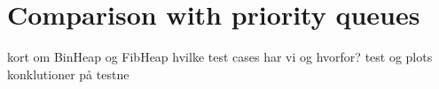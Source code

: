 \section*{Comparison with priority queues}
kort om BinHeap og FibHeap
hvilke test cases har vi og hvorfor?
test og plots
konklutioner på testne